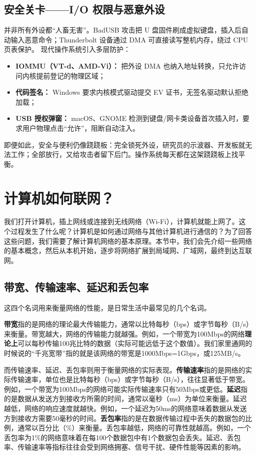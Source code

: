 \subsection{安全关卡——I/O 权限与恶意外设}
并非所有外设都“人畜无害”。BadUSB 攻击把 U 盘固件刷成虚拟键盘，插入后自动输入恶意命令；Thunderbolt 设备通过 DMA 可直接读写整机内存，绕过 CPU 页表保护。
现代操作系统引入多层防护：
\begin{itemize}
\item \textbf{IOMMU（VT-d、AMD-Vi）：} 把外设 DMA 也纳入地址转换，只允许访问内核提前登记的物理区域；
\item \textbf{代码签名：} Windows 要求内核模式驱动提交 EV 证书，无签名驱动默认拒绝加载；
\item \textbf{USB 授权弹窗：} macOS、GNOME 检测到键盘/网卡类设备首次插入时，要求用户物理点击“允许”，阻断自动注入。
\end{itemize}
即便如此，安全与便利仍像跷跷板：完全锁死外设，研究员的示波器、开发板就无法工作；全部放行，又给攻击者留下后门。操作系统每天都在这架跷跷板上找平衡。

\section{计算机如何联网？}

我们打开计算机，插上网线或连接到无线网络（Wi-Fi），计算机就能上网了。这个过程发生了什么呢？计算机是如何通过网络与其他计算机进行通信的？为了回答这些问题，我们需要了解计算机网络的基本原理。本节中，我们会先介绍一些网络的基本概念，然后从本机开始，逐步将网络扩展到局域网、广域网，最终到达互联网。

\subsection{带宽、传输速率、延迟和丢包率}

这四个名词用来衡量网络的性能，是日常生活中最常见的几个名词。

\textbf{带宽}指的是网络的理论最大传输能力，通常以比特每秒（bps）或字节每秒（B/s）来衡量。带宽越大，网络的传输能力就越强。例如，一个带宽为100Mbps的网络\textbf{理论上}可以每秒传输100兆比特的数据（实际可能远低于这个数值）。我们家里通网的时候说的“千兆宽带”指的就是该网络的带宽是1000Mbps=1Gbps，或125MB/s。

而传输速率、延迟、丢包率则用于衡量网络的实际表现。\textbf{传输速率}指的是网络的实际传输速率，单位也是比特每秒（bps）或字节每秒（B/s），往往显著低于带宽。例如，一个带宽为100Mbps的网络可能实际传输速率只有50Mbps或更低。\textbf{延迟}指的是数据从发送方到接收方所需的时间，通常以毫秒（ms）为单位来衡量。延迟越低，网络的响应速度就越快。例如，一个延迟为50ms的网络意味着数据从发送方到接收方需要50毫秒的时间。\textbf{丢包率}指的是在数据传输过程中丢失的数据包的比例，通常以百分比（\%）来衡量。丢包率越低，网络的可靠性就越高。例如，一个丢包率为1\%的网络意味着在每100个数据包中有1个数据包会丢失。延迟、丢包率、传输速率等指标往往会受到网络拥塞、信号干扰、硬件性能等因素的影响。

